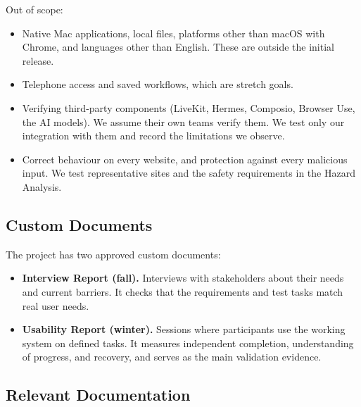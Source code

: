 \documentclass[12pt, titlepage]{article}
\begin{document}
Out of scope:
\begin{itemize}
  \item Native Mac applications, local files, platforms other than macOS with
  Chrome, and languages other than English. These are outside the initial
  release.
  \item Telephone access and saved workflows, which are stretch goals.
  \item Verifying third-party components (LiveKit, Hermes, Composio, Browser
  Use, the AI models). We assume their own teams verify them. We test only our
  integration with them and record the limitations we observe.
  \item Correct behaviour on every website, and protection against every
  malicious input. We test representative sites and the safety requirements in
  the Hazard Analysis.
\end{itemize}

\subsection{Custom Documents}

The project has two approved custom documents:
\begin{itemize}
  \item \textbf{Interview Report (fall).} Interviews with stakeholders about
  their needs and current barriers. It checks that the requirements and test
  tasks match real user needs.
  \item \textbf{Usability Report (winter).} Sessions where participants use the
  working system on defined tasks. It measures independent completion,
  understanding of progress, and recovery, and serves as the main validation
  evidence.
\end{itemize}

\subsection{Relevant Documentation}
\end{document}
